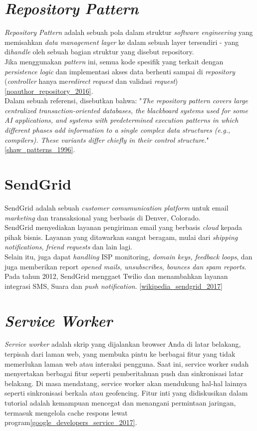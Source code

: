 	\section{\textit{Repository Pattern}}
	\textit{Repository Pattern} adalah sebuah pola dalam struktur \textit{software engineering} yang memisahkan \textit{data management layer} ke dalam sebuah layer tersendiri - yang di\textit{handle} oleh sebuah bagian struktur yang disebut repository. 
	\\ \indent
	Jika menggunakan \textit{pattern} ini, semua kode spesifik yang terkait dengan \textit{persistence logic} dan implementasi akses data berhenti sampai di \textit{repository} (\textit{controller} hanya me\textit{redirect} \textit{request} dan validasi \textit{request})\ref{noauthor_repository_2016}.
	\\ \indent
	Dalam sebuah referensi, disebutkan bahwa: "\textit{The repository pattern covers large centralized transaction-oriented databases, the blackboard systems used for some AI applications, and systems with predetermined execution patterns in which different phases add information to a single complex data structures (e.g., compilers). These variants differ chiefly in their control structure.}" \ref{shaw_patterns_1996}.
	
	\section{SendGrid}
	SendGrid adalah sebuah \textit{customer comumunication platform} untuk email \textit{marketing} dan transaksional yang berbasis di Denver, Colorado.
	\\ \indent
	SendGrid menyediakan layanan pengiriman email yang berbasis \textit{cloud} kepada pihak bisnis. Layanan yang ditawarkan sangat beragam, mulai dari \textit{shipping notifications}, \textit{friend requests} dan lain lagi. \\ \indent
	Selain itu, juga dapat \textit{handling} ISP monitoring, \textit{domain keys, feedback loops}, dan juga memberikan report \textit{opened mails, unsubscribes, bounces dan spam reports}. Pada tahun 2012, SendGrid menggaet Twilio dan menambahkan layanan integrasi SMS, Suara dan \textit{push notification}. \ref{wikipedia_sendgrid_2017}
	
	\section{\textit{Service Worker}}
	\textit{Service worker }adalah skrip yang dijalankan browser Anda di latar belakang, terpisah dari laman web, yang membuka pintu ke berbagai fitur yang tidak memerlukan laman web atau interaksi pengguna. Saat ini, service worker sudah menyertakan berbagai fitur seperti pemberitahuan push dan sinkronisasi latar belakang. Di masa mendatang, service worker akan mendukung hal-hal lainnya seperti sinkronisasi berkala atau geofencing. Fitur inti yang didiskusikan dalam tutorial adalah kemampuan mencegat dan menangani permintaan jaringan, termasuk mengelola cache respons lewat program\ref{google_developers_service_2017}.
	
